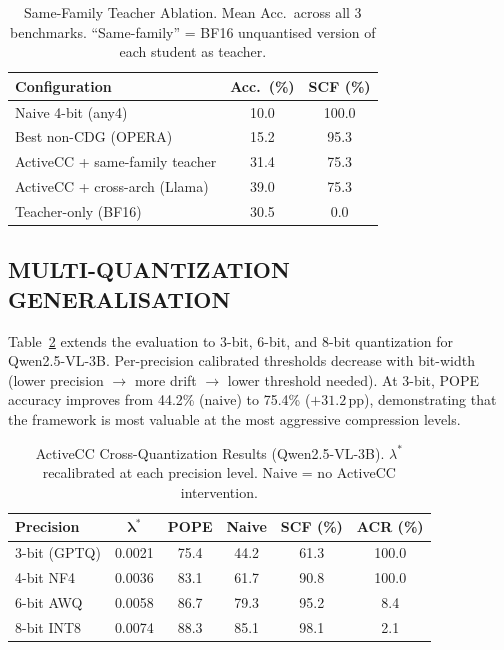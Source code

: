 \documentclass{ieeetmlcn}
\begin{document}
\begin{table}[htbp]
\caption{Same-Family Teacher Ablation. Mean Acc.\ across all 3 benchmarks. ``Same-family'' = BF16 unquantised version of each student as teacher.}
\label{tab:ablation}
\centering
\begin{tabular}{p{4.5cm}cc}
\toprule
\textbf{Configuration} & \textbf{Acc.\ (\%)} & \textbf{SCF (\%)} \\
\midrule
Naive 4-bit (any4)             & 10.0 & 100.0 \\
Best non-CDG (OPERA)           & 15.2 &  95.3 \\
ActiveCC + same-family teacher & 31.4 &  75.3 \\
ActiveCC + cross-arch (Llama)  & 39.0 &  75.3 \\
Teacher-only (BF16)            & 30.5 &   0.0 \\
\bottomrule
\end{tabular}
\end{table}

\subsection{MULTI-QUANTIZATION GENERALISATION}
Table~\ref{tab:multiquant} extends the evaluation to 3-bit, 6-bit, and
8-bit quantization for Qwen2.5-VL-3B. Per-precision calibrated
thresholds decrease with bit-width (lower precision $\to$ more drift
$\to$ lower threshold needed). At 3-bit, POPE accuracy improves from
44.2\% (naive) to 75.4\% ($+31.2$\,pp), demonstrating that the
framework is most valuable at the most aggressive compression levels.

\begin{table}[htbp]
\caption{ActiveCC Cross-Quantization Results (Qwen2.5-VL-3B).
$\lambda^*$ recalibrated at each precision level. Naive = no ActiveCC
intervention.}
\label{tab:multiquant}
\centering
\begin{tabular}{lccccc}
\toprule
\textbf{Precision} & $\boldsymbol{\lambda^*}$ & \textbf{POPE} &
\textbf{Naive} & \textbf{SCF (\%)} & \textbf{ACR (\%)} \\
\midrule
3-bit (GPTQ) & 0.0021 & 75.4 & 44.2 & 61.3 & 100.0 \\
4-bit NF4    & 0.0036 & 83.1 & 61.7 & 90.8 & 100.0 \\
6-bit AWQ    & 0.0058 & 86.7 & 79.3 & 95.2 &   8.4 \\
8-bit INT8   & 0.0074 & 88.3 & 85.1 & 98.1 &   2.1 \\
\bottomrule
\end{tabular}
\end{table}
\end{document}

